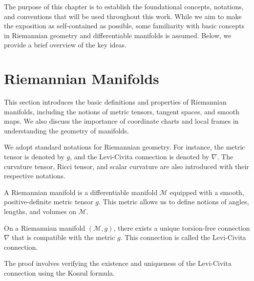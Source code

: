 \PlaceText{69mm}{79mm}{ \color{gal}\noindent\makebox[\linewidth]{\rule{2\paperwidth}{1pt}}}

\color{black}


The purpose of this chapter is to establish the foundational concepts, notations, and conventions that will be used throughout this work. While we aim to make the exposition as self-contained as possible, some familiarity with basic concepts in Riemannian geometry and differentiable manifolds is assumed. Below, we provide a brief overview of the key ideas.

\section{Riemannian Manifolds}
\PlaceText{15mm}{13mm}{ \color{white}\noindent\makebox[\linewidth]{\rule{2\paperwidth}{10pt}}}
\vspace{-1.5cm}
\begin{oobs}
This section introduces the basic definitions and properties of Riemannian manifolds, including the notions of metric tensors, tangent spaces, and smooth maps. We also discuss the importance of coordinate charts and local frames in understanding the geometry of manifolds.
\end{oobs}

\begin{oobs}
We adopt standard notations for Riemannian geometry. For instance, the metric tensor is denoted by \( g \), and the Levi-Civita connection is denoted by \( \nabla \). The curvature tensor, Ricci tensor, and scalar curvature are also introduced with their respective notations.
\end{oobs}

\begin{deff}
A Riemannian manifold is a differentiable manifold \( \mathcal{M} \) equipped with a smooth, positive-definite metric tensor \( g \). This metric allows us to define notions of angles, lengths, and volumes on \( \mathcal{M} \).
\end{deff}

\begin{teorema}
On a Riemannian manifold \( (\mathcal{M}, g) \), there exists a unique torsion-free connection \( \nabla \) that is compatible with the metric \( g \). This connection is called the Levi-Civita connection.
\end{teorema}

\begin{demm}
The proof involves verifying the existence and uniqueness of the Levi-Civita connection using the Koszul formula.
\end{demm}

